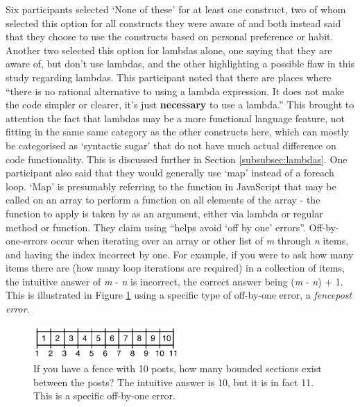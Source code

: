 \documentclass{article}
\begin{document}
            Six participants selected `None of these' for at least one construct, two of whom selected this option for all constructs they were aware of and both instead said that they choose to use the constructs based on personal preference or habit. Another two selected this option for lambdas alone, one saying that they are aware of, but don't use lambdas, and the other highlighting a possible flaw in this study regarding lambdas. This participant noted that there are places where ``there is no rational alternative to using a lambda expression. It does not make the code simpler or clearer, it's just \textbf{necessary} to use a lambda.'' This brought to attention the fact that lambdas may be a more functional language feature, not fitting in the same same category as the other constructs here, which can mostly be categorised as `syntactic sugar' that do not have much actual difference on code functionality. This is discussed further in Section \ref{subsubsec:lambdas}.
            One participant also said that they would generally use `map' instead of a foreach loop. `Map' is presumably referring to the  function in JavaScript that may be called on an array to perform a function on all elements of the array - the function to apply is taken by  as an argument, either via lambda or regular method or function. They claim using  ``helps avoid `off by one' errors''.  Off-by-one-errors occur when iterating over an array or other list of \textit{m} through \textit{n} items, and having the index incorrect by one. For example, if you were to ask how many items there are (how many loop iterations are required) in a collection of items, the intuitive answer of \textit{m} - \textit{n} is incorrect, the correct answer being (\textit{m} - \textit{n}) + 1. This is illustrated in Figure \ref{fig:fencepost} using a specific type of off-by-one error, a \textit{fencepost error}.

            \begin{figure}[htbp]
                \centering
                \includegraphics[width=0.5\textwidth]{fencepost}
                \caption{If you have a fence with 10 posts, how many bounded sections exist between the posts? The intuitive answer is 10, but it is in fact 11. This is a specific off-by-one error.}
                \label{fig:fencepost}
            \end{figure}
\end{document}
